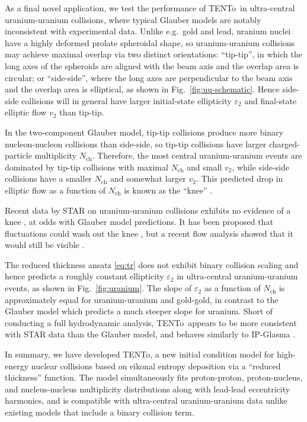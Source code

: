 \documentclass[aps,prc,reprint,amsmath,nofootinbib]{revtex4-1}
\newcommand{\psec}[1]{\phantomsection\addcontentsline{toc}{section}{#1}}
\newcommand{\trento}{T\raisebox{-.5ex}{R}ENTo}
\newcommand{\nch}{N_\text{ch}}
\begin{document}
As a final novel application, we test the performance of \trento\ in ultra-central uranium-uranium collisions, where typical Glauber models are notably inconsistent with experimental data.
Unlike e.g.~gold and lead, uranium nuclei have a highly deformed prolate spheroidal shape, so uranium-uranium collisions may achieve maximal overlap via two distinct orientations:
``tip-tip'', in which the long axes of the spheroids are aligned with the beam axis and the overlap area is circular;
or ``side-side'', where the long axes are perpendicular to the beam axis and the overlap area is elliptical, as shown in Fig.~\ref{fig:uu-schematic}.
Hence side-side collisions will in general have larger initial-state ellipticity $\varepsilon_2$ and final-state elliptic flow $v_2$ than tip-tip.

In the two-component Glauber model, tip-tip collisions produce more binary nucleon-nucleon collisions than side-side, so tip-tip collisions have larger charged-particle multiplicity $\nch$.
Therefore, the most central uranium-uranium events are dominated by tip-tip collisions with maximal $\nch$ and small $v_2$, while side-side collisions have a smaller $\nch$ and somewhat larger $v_2$.
This predicted drop in elliptic flow as a function of $\nch$ is known as the ``knee'' \cite{Voloshin:2010ut}.

Recent data by STAR on uranium-uranium collisions exhibits no evidence of a knee \cite{FortheSTAR:2013bza,Wang:2014qxa}, at odds with Glauber model predictions.
It has been proposed that fluctuations could wash out the knee \cite{Rybczynski:2012av}, but a recent flow analysis showed that it would still be visible \cite{Goldschmidt:2015qya}.

The reduced thickness ansatz \eqref{eq:tr} does not exhibit binary collision scaling and hence predicts a roughly constant ellipticity $\varepsilon_2$ in ultra-central uranium-uranium events, as shown in Fig.~\ref{fig:uranium}.
The slope of $\varepsilon_2$ as a function of $\nch$ is approximately equal for uranium-uranium and gold-gold, in contrast to the Glauber model which predicts a much steeper slope for uranium.
Short of conducting a full hydrodynamic analysis, \trento\ appears to be more consistent with STAR data than the Glauber model, and behaves similarly to IP-Glasma \cite{Wang:2014qxa}.

\psec{Conclusion}

In summary, we have developed \trento, a new initial condition model for high-energy nuclear collisions based on eikonal entropy deposition via a ``reduced thickness'' function.
The model simultaneously fits proton-proton, proton-nucleus, and nucleus-nucleus multiplicity distributions along with lead-lead eccentricity harmonics, and is compatible with ultra-central uranium-uranium data unlike existing models that include a binary collision term.
\end{document}
